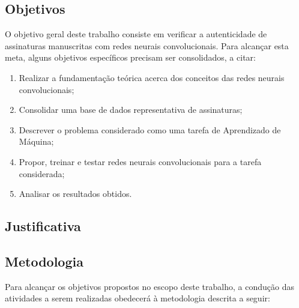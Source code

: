 
\subsection{Objetivos}

O objetivo geral deste trabalho consiste em verificar a autenticidade de assinaturas manuscritas com redes neurais convolucionais. Para alcançar esta meta, alguns objetivos específicos precisam ser consolidados, a citar:

\begin{enumerate}
  \item Realizar a fundamentação teórica acerca dos conceitos das redes neurais convolucionais;
  \item Consolidar uma base de dados representativa de assinaturas;
  \item Descrever o problema considerado como uma tarefa de Aprendizado de Máquina;
  \item Propor, treinar e testar redes neurais convolucionais para a tarefa considerada;
  \item Analisar os resultados obtidos.
\end{enumerate}

\subsection{Justificativa}



\subsection{Metodologia}

Para alcançar os objetivos propostos no escopo deste trabalho, a condução das atividades a serem realizadas obedecerá à metodologia descrita a seguir:

